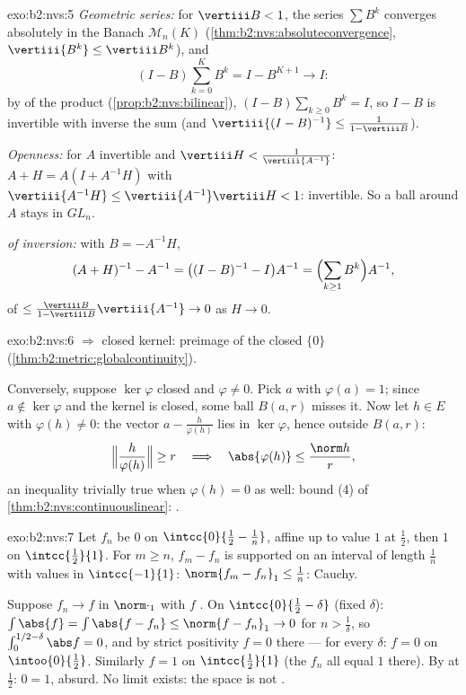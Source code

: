 \begin{solution}{exo:b2:nvs:5}
\emph{Geometric series:} for $\vertiii B < 1$, the series $\sum
B^k$ converges absolutely in the Banach $\mathcal{M}_n(K)$
(\cref{thm:b2:nvs:absoluteconvergence}, $\vertiii{B^k} \leq
\vertiii B^k$), and
\[
(I - B)\sum_{k=0}^{K} B^k = I - B^{K+1} \longrightarrow I :
\]
by  of the product
(\cref{prop:b2:nvs:bilinear}), $(I - B)\sum_{k\geq0} B^k = I$, so
$I - B$ is invertible with inverse the sum (and
$\vertiii{(I-B)^{-1}} \leq \frac{1}{1 - \vertiii B}$).

\emph{Openness:} for $A$ invertible and $\vertiii H <
\frac{1}{\vertiii{A^{-1}}}$: $A + H = A(I + A^{-1}H)$ with
$\vertiii{A^{-1}H} \leq \vertiii{A^{-1}}\vertiii H < 1$: invertible.
So a ball around $A$ stays in $GL_n$.

\emph{ of inversion:} with $B = -A^{-1}H$,
\[
(A + H)^{-1} - A^{-1} = \bigl((I - B)^{-1} - I\bigr)A^{-1}
= \Bigl(\sum_{k \geq 1} B^k\Bigr) A^{-1},
\]
of  $\leq \frac{\vertiii B}{1 - \vertiii B}\vertiii{A^{-1}}
\to 0$ as $H \to 0$.
\end{solution}

\begin{solution}{exo:b2:nvs:6}
 $\Rightarrow$ closed kernel: preimage of the closed
$\{0\}$ (\cref{thm:b2:metric:globalcontinuity}).

Conversely, suppose $\ker\varphi$ closed and $\varphi \neq 0$. Pick
$a$ with $\varphi(a) = 1$; since $a \notin \ker\varphi$ and the
kernel is closed, some ball $B(a, r)$ misses it. Now let $h \in E$
with $\varphi(h) \neq 0$: the vector $a - \frac{h}{\varphi(h)}$
lies in $\ker\varphi$, hence outside $B(a, r)$:
\[
\Bigl\Vert \frac{h}{\varphi(h)} \Bigr\Vert \geq r
\quad\Longrightarrow\quad
\abs{\varphi(h)} \leq \frac{\norm h}{r},
\]
an inequality trivially true when $\varphi(h) = 0$ as well: bound
(4) of \cref{thm:b2:nvs:continuouslinear}: .
\end{solution}

\begin{solution}{exo:b2:nvs:7}
Let $f_n$ be $0$ on $\intcc{0}{\frac12 - \frac1n}$, affine up to
value $1$ at $\frac12$, then $1$ on $\intcc{\frac12}{1}$. For $m
\geq n$, $f_m - f_n$ is supported on an interval of length
$\frac1n$ with values in $\intcc{-1}{1}$: $\norm{f_m - f_n}_1 \leq
\frac1n$: Cauchy.

Suppose $f_n \to f$ in $\norm\cdot_1$ with $f$ . On
$\intcc{0}{\frac12 - \delta}$ (fixed $\delta$): $\int \abs{f} =
\int\abs{f - f_n} \leq \norm{f - f_n}_1 \to 0$ for $n >
\frac1\delta$, so $\int_0^{1/2 - \delta}\abs f = 0$, and by strict
positivity $f = 0$ there --- for every $\delta$: $f = 0$ on
$\intoo{0}{\frac12}$. Similarly $f = 1$ on $\intcc{\frac12}{1}$
(the $f_n$ all equal $1$ there). By  at $\frac12$: $0 =
1$, absurd. No limit exists: the space is not .
\end{solution}


